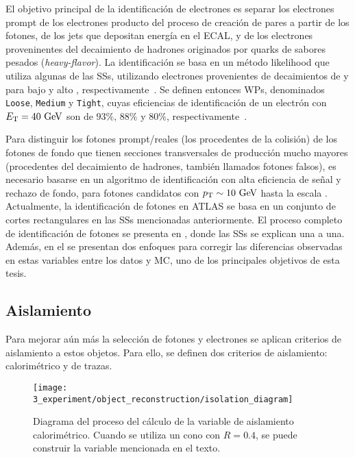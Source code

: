 El objetivo principal de la identificaci\'on de electrones es separar los electrones prompt de los electrones producto del proceso de creaci\'on de pares a partir de los fotones, de los jets que depositan energ\'ia en el \ac{ECAL}, y de los electrones proveninentes del decaimiento de hadrones originados por quarks de sabores pesados (\textit{heavy-flavor}). La identificaci\'on se basa en un m\'etodo likelihood que utiliza algunas de las \acp{SS}, utilizando electrones provenientes de decaimientos de \jpsi y \Zboson para bajo y alto \et, respectivamente~\cite{ATLAS-EGamma-Performance-2024}. Se definen entonces \acp{WP}, denominados \texttt{Loose}, \texttt{Medium} y \texttt{Tight}, cuyas eficiencias de identificaci\'on de un electr\'on con \(E_{\text{T}}=40~\text{GeV}\) son de \(93\%, \, 88\%\) y \(80\%\), respectivamente~\cite{ATLAS-EGamma-Calibration-2015-2016}.


Para distinguir los fotones prompt/reales (los procedentes de la colisión) de los fotones de fondo que tienen secciones transversales de producción mucho mayores (procedentes del decaimiento de hadrones, también llamados fotones falsos), es necesario basarse en un algoritmo de identificación con alta eficiencia de señal y rechazo de fondo, para fotones candidatos con \(p_{\text{T}} \sim 10~\text{GeV}\) hasta la escala \tev.
Actualmente, la identificación de fotones en \ac{ATLAS} se basa en un conjunto de cortes rectangulares en las \acp{SS} mencionadas anteriormente.
El proceso completo de identificación de fotones se presenta en \Ch{\ref{ch:pid_ss}}, donde las \acp{SS} se explican una a una. Además, en el \Ch{\ref{ch:ffs}} se presentan dos enfoques para corregir las diferencias observadas en estas variables entre los datos y \ac{MC}, uno de los principales objetivos de esta tesis.





\subsection{Aislamiento}
\label{subsec:objects:egamma:iso}

Para mejorar aún más la selecci\'on de fotones y electrones se aplican criterios de aislamiento a estos objetos. Para ello, se definen dos criterios de aislamiento: calorim\'etrico y de trazas. 

\begin{figure}[ht!]
    \centering
    \texttt{[image: 3\_experiment/object\_reconstruction/isolation\_diagram]}
    \caption{Diagrama del proceso del c\'alculo de la variable de aislamiento calorim\'etrico. Cuando se utiliza un cono con \(R=0.4\), se puede construir la variable \etconefo mencionada en el texto.}
    \label{fig:objects:egamma:iso:iso_diagram}
\end{figure}

